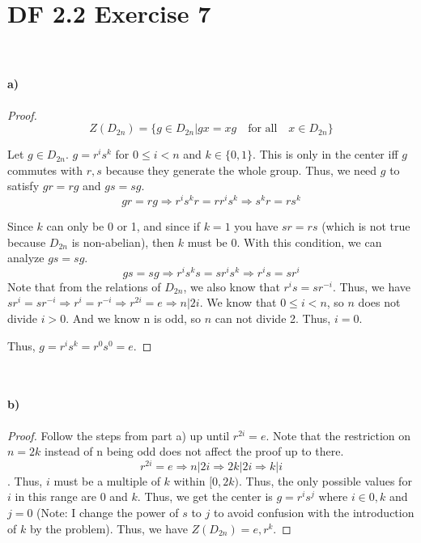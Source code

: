 \documentclass{article}
\begin{document}
\section{DF 2.2 Exercise 7}
~\paragraph{a)}
\begin{proof}
\[
Z(D_{2n}) = \{g \in D_{2n} | gx=xg \quad \textrm{for all} \quad x\in D_{2n}\}
\]

Let $g \in D_{2n}$. $g=r^is^k$ for $0 \leq i < n$ and $k \in \{0, 1\}$. This is only in the center iff $g$ commutes with $r, s$ because they generate the whole group. Thus, we need $g$ to satisfy $gr=rg$ and $gs=sg$.
\[
gr=rg \Rightarrow r^is^kr=rr^is^k \Rightarrow s^kr = rs^k
\]

Since $k$ can only be 0 or 1, and since if $k=1$ you have $sr = rs$ (which is not true because $D_{2n}$ is non-abelian), then $k$ must be 0. With this condition, we can analyze $gs=sg$.
\[
gs=sg \Rightarrow r^is^ks=sr^is^k \Rightarrow r^is=sr^i
\]
Note that from the relations of $D_{2n}$, we also know that $r^is=sr^{-i}$. Thus, we have $sr^i=sr^{-i} \Rightarrow r^i=r^{-i} \Rightarrow r^{2i}=e \Rightarrow n|2i$. We know that $0\leq i < n$, so $n$ does not divide $i>0$. And we know n is odd, so $n$ can not divide 2. Thus, $i=0$.

Thus, $g=r^is^k=r^0s^0=e$.
\end{proof}
~\paragraph{b)}
\begin{proof}
Follow the steps from part a) up until $r^{2i} = e$. Note that the restriction on $n=2k$ instead of n being odd does not affect the proof up to there. 
\[r^{2i} = e \Rightarrow n|2i \Rightarrow 2k|2i \Rightarrow k|i\]. 
Thus, $i$ must be a multiple of $k$ within $[0, 2k)$. Thus, the only possible values for $i$ in this range are 0 and $k$. Thus, we get the center is $g=r^is^j$ where $i \in {0, k}$ and $j=0$ (Note: I change the power of $s$ to $j$ to avoid confusion with the introduction of $k$ by the problem).
Thus, we have $Z(D_{2n})={e, r^k}$.
\end{proof}
\end{document}
